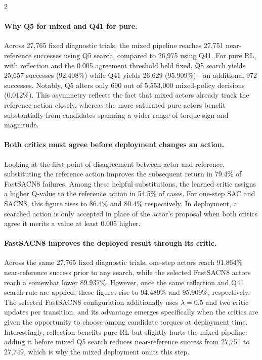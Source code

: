 \begin{multicols}{2}
\paragraph{Why Q5 for mixed and Q41 for pure.}
Across 27,765 fixed diagnostic trials, the mixed pipeline reaches
27,751 near-reference successes using Q5 search, compared to 26,975
using Q41. For pure RL, with reflection and the 0.005 agreement
threshold held fixed, Q5 search yields 25,657 successes (92.408\%)
while Q41 yields 26,629 (95.909\%)—an additional 972 successes. Notably,
Q5 alters only 690 out of 5,553,000 mixed-policy decisions (0.012\%).
This asymmetry reflects the fact that mixed actors already track the
reference action closely, whereas the more saturated pure actors
benefit substantially from candidates spanning a wider range of torque
sign and magnitude.

\paragraph{Both critics must agree before deployment changes an action.}
Looking at the first point of disagreement between actor and
reference, substituting the reference action improves the subsequent
return in 79.4\% of FastSACN8 failures. Among these helpful
substitutions, the learned critic assigns a higher Q-value to the
reference action in 54.5\% of cases. For one-step SAC and SACN8, this
figure rises to 86.4\% and 80.4\% respectively. In deployment, a
searched action is only accepted in place of the actor's proposal when
both critics agree it merits a value at least 0.005 higher.

\paragraph{FastSACN8 improves the deployed result through its critic.}
Across the same 27,765 fixed diagnostic trials, one-step actors reach
91.864\% near-reference success prior to any search, while the
selected FastSACN8 actors reach a somewhat lower 89.937\%. However,
once the same reflection and Q41 search rule are applied, these
figures rise to 94.489\% and 95.909\%, respectively. The selected
FastSACN8 configuration additionally uses $\lambda=0.5$ and two critic
updates per transition, and its advantage emerges specifically when
the critics are given the opportunity to choose among candidate
torques at deployment time. Interestingly, reflection benefits pure RL
but slightly hurts the mixed pipeline: adding it before mixed Q5
search reduces near-reference success from 27,751 to 27,749, which is
why the mixed deployment omits this step.


\end{multicols}

